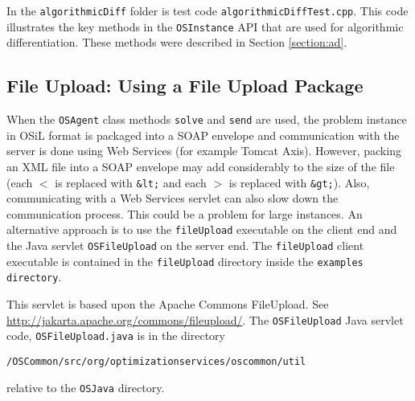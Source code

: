 \documentclass[11pt]{article}
\renewcommand{\_}{{\char"5F}}
\renewcommand{\{}{{\char"7B}}
\renewcommand{\}}{{\char"7D}}
\renewcommand{\^}{{\char"0D}}
\renewcommand{\'}{{\char"0D}}
\begin{document}
In the {\tt algorithmicDiff} folder is test code {\tt algorithmicDiffTest.cpp}. This code illustrates the key methods in the {\tt OSInstance} API that are used for algorithmic differentiation.   These methods were described in Section \ref{section:ad}.



\subsection{File Upload:  Using a File Upload Package}\label{section:fileupload}  



When the {\tt OSAgent}  class methods {\tt solve} and {\tt send} are used, the problem instance in OSiL format is packaged into a SOAP envelope and communication with the server is done using Web Services (for example Tomcat Axis). However, packing an XML file into a SOAP envelope may add considerably to the size of the file (each {\tt $<$} is replaced with {\tt \&lt;}  and each {\tt $>$} is replaced with {\tt \&gt;}). Also, communicating with a Web Services servlet can also slow down the communication process. This could be a problem for large instances. An alternative approach is to use the {\tt fileUpload} executable on the client end  and the Java servlet {\tt OSFileUpload} on the server end.  The {\tt fileUpload} client executable is contained in the {\tt fileUpload}  directory inside the {\tt examples directory}.

This servlet is based upon the Apache Commons FileUpload. See \url{http://jakarta.apache.org/commons/fileupload/}. The {\tt OSFileUpload} Java servlet code, {\tt OSFileUpload.java} is in the directory
\begin{verbatim}
/OSCommon/src/org/optimizationservices/oscommon/util
\end{verbatim}
relative to the {\tt OSJava} directory. 
\end{document}
